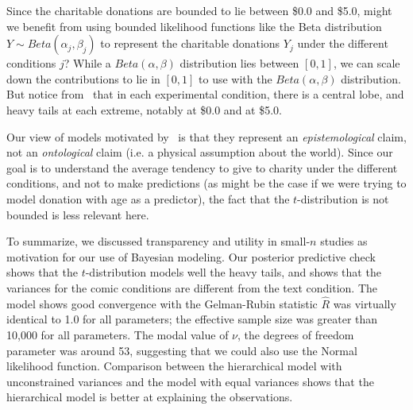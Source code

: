 Since the charitable donations are bounded to lie between \$0.0 and \$5.0, might we benefit from using bounded likelihood functions like the Beta distribution $Y \sim Beta(\alpha_j, \beta_j)$ to represent the charitable donations $Y_j$ under the different conditions $j$? While a $Beta(\alpha, \beta)$ distribution lies between $[0,1]$, we can scale down the contributions to lie in $[0,1]$ to use with the $Beta(\alpha, \beta)$ distribution. But notice from~ that in each experimental condition, there is a central lobe, and heavy tails at each extreme, notably at \$0.0 and at \$5.0. 

Our view of models motivated by~\textcite{McElreath2015} is that they represent an \textit{epistemological} claim, not an \textit{ontological} claim (i.e. a physical assumption about the world). Since our goal is to understand the average tendency to give to charity under the different conditions, and not to make predictions (as might be the case if we were trying to model donation with age as a predictor), the fact that the $t$-distribution is not bounded is less relevant here. 

To summarize, we discussed transparency and utility in small-$n$ studies as motivation for our use of Bayesian modeling. Our posterior predictive check shows that the $t$-distribution models well the heavy tails, and shows that the variances for the comic conditions are different from the text condition. The model shows good convergence with the Gelman-Rubin statistic $\hat{R}$ was virtually identical to 1.0 for all parameters; the effective sample size was greater than 10,000 for all parameters. The modal value of $\nu$, the degrees of freedom parameter was around 53, suggesting that we could also use the Normal likelihood function. Comparison between the hierarchical model with unconstrained variances and the model with equal variances shows that the hierarchical model is better at explaining the observations.





